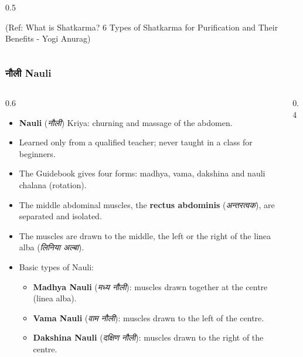 \begin{frame}[fragile,shrink=6]
\begin{columns}
\begin{column}[T]{0.5\linewidth}
\begin{center}
		{\tiny (Ref: What is Shatkarma? 6 Types of Shatkarma for Purification and Their Benefits - Yogi Anurag)}	
        \end{center}	
    \end{column}
\end{columns}
\end{frame}


\begin{frame}[fragile]\frametitle{नौली Nauli}\footnotesize
\begin{columns}
    \begin{column}[T]{0.6\linewidth}
      \begin{itemize}
          \item \textbf{Nauli} (\textit{नौली}) Kriya: churning and massage of the abdomen.
          \item Learned only from a qualified teacher; never taught in a class for beginners.
          \item The Guidebook gives four forms: madhya, vama, dakshina and nauli chalana (rotation).
          \item The middle abdominal muscles, the \textbf{rectus abdominis} (\textit{अन्तरत्वक}), are separated and isolated.
          \item The muscles are drawn to the middle, the left or the right of the linea alba (\textit{लिनिया अल्बा}).
          \item Basic types of Nauli:
            \begin{itemize}
              \item \textbf{Madhya Nauli} (\textit{मध्य नौली}): muscles drawn together at the centre (linea alba).
              \item \textbf{Vama Nauli} (\textit{वाम नौली}): muscles drawn to the left of the centre.
              \item \textbf{Dakshina Nauli} (\textit{दक्षिण नौली}): muscles drawn to the right of the centre.
            \end{itemize}
      \end{itemize}
    \end{column}
    \begin{column}[T]{0.4\linewidth}
        \begin{center}

\end{center}
\end{column}
\end{columns}
\end{frame}
